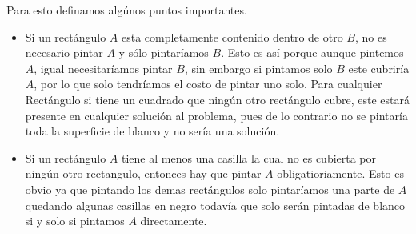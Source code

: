 \documentclass{article}
\begin{document}
Para esto definamos algúnos puntos importantes. 
\begin{itemize}

\item Si un rectángulo $A$ esta completamente contenido dentro de otro $B$, no es necesario pintar $A$ y sólo pintaríamos $B$. Esto es así porque aunque pintemos $A$, igual necesitaríamos pintar $B$, sin embargo si pintamos solo $B$ este cubriría $A$, por lo que solo tendríamos el costo de pintar uno solo. Para cualquier Rectángulo si tiene un cuadrado que ningún otro rectángulo cubre, este estará presente en cualquier solución al problema, pues de lo contrario no se pintaría toda la superficie de blanco y no sería una solución.\\
\vspace{0.2cm}
\begin{center}


\end{center}
\item Si un rectángulo $A$ tiene al menos una casilla la cual no es cubierta por ningún otro rectangulo, entonces hay que pintar $A$ obligatioriamente. Esto es obvio ya que pintando los demas rectángulos solo pintaríamos una parte de $A$ quedando algunas casillas en negro todavía que solo serán pintadas de blanco si y solo si pintamos $A$ directamente.
\\
\vspace{0.2cm}

\begin{center}


\end{center}
\end{itemize}
\end{document}

